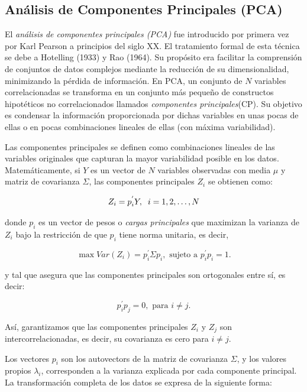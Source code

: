 \subsection{Análisis de Componentes Principales (PCA)}

El \textit{análisis de componentes principales (PCA)} fue introducido por primera vez por Karl Pearson a principios del siglo XX. El 
tratamiento formal de esta técnica se debe a Hotelling (1933) y Rao (1964). Su propósito era facilitar la comprensión de conjuntos 
de datos complejos mediante la reducción de su dimensionalidad, minimizando la pérdida de información. En PCA, un conjunto de $N$ variables correlacionadas
se transforma en un conjunto más pequeño de constructos hipotéticos no correlacionados llamados \textit{componentes principales}(CP).
Su objetivo es condensar la información proporcionada por dichas variables en unas pocas de ellas o en pocas combinaciones lineales de 
ellas (con máxima variabilidad). \newline %


Las componentes principales se definen como combinaciones lineales de las variables originales que capturan la mayor variabilidad
posible en los datos. Matemáticamente, si $Y$ es un vector de $N$ variables observadas con media $\mu$ y matriz de covarianza $\Sigma$,
las componentes principales $Z_{i}$ se obtienen como:


\[
Z_{i} = p^{'}_{i} Y, \hspace{0.2cm} i=1,2,\dots,N
\]

donde $p_{i}$ es un vector de pesos o \textit{cargas principales} que maximizan la varianza de $Z_{i}$ bajo la restricción de que $p_{i}$
tiene norma unitaria, es decir,

\[%
\max Var(Z_{i}) = p_{i}^{'}\Sigma p_{i}, \text{ sujeto a } p_{i}^{'}p_{i} = 1.
\]

y tal que asegura que las componentes principales son ortogonales entre sí, es decir:

\[
p_{i}^{'}p_{j} = 0, \text{ para } i \neq j.
\]

Así, garantizamos que las componentes principales $Z_{i}$ y $Z_{j}$ son intercorrelacionadas, es decir, su covarianza es cero para $i\neq j$.


Los vectores $p_{i}$ son los autovectors de la matriz de covarianza $\Sigma$, y los valores propios $\lambda_{i}$, corresponden
a la varianza explicada por cada componente principal. La transformación completa de los datos se expresa de la siguiente forma:

